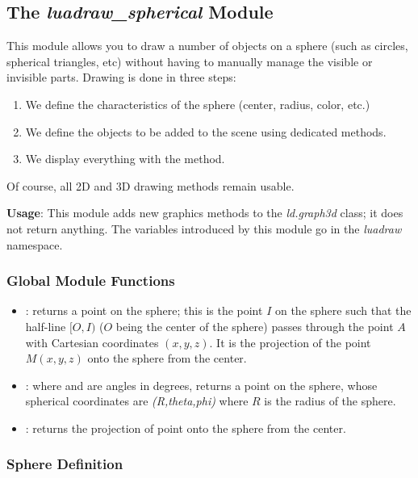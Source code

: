 \subsection{The \emph{luadraw\_spherical} Module} 

This module allows you to draw a number of objects on a sphere (such as circles, spherical triangles, etc) without having to manually manage the visible or invisible parts. Drawing is done in three steps:
\begin{enumerate}
    \item We define the characteristics of the sphere (center, radius, color, etc.)
    \item We define the objects to be added to the scene using dedicated methods.
    \item We display everything with the  method.
\end{enumerate}
Of course, all 2D and 3D drawing methods remain usable.

\textbf{Usage}: This module adds new graphics methods to the \emph{ld.graph3d} class; it does not return anything. The variables introduced by this module go in the \emph{luadraw} namespace.

\subsubsection{Global Module Functions}

\begin{itemize}
         \item {}: returns a point on the sphere; this is the point $I$ on the sphere such that the half-line $[O,I)$ ($O$ being the center of the sphere) passes through the point $A$ with Cartesian coordinates $(x,y,z)$. It is the projection of the point $M(x,y,z)$ onto the sphere from the center.
        \item {}: where  and  are angles in degrees, returns a point on the sphere, whose spherical coordinates are \emph{(R,theta,phi)} where $R$ is the radius of the sphere.
        \item {}: returns the projection of point  onto the sphere from the center.
\end{itemize}



\subsubsection{Sphere Definition}


